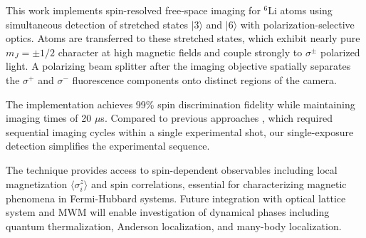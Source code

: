 This work implements spin-resolved free-space imaging for $^6$Li atoms using simultaneous detection of stretched states $|3\rangle$ and $|6\rangle$ with polarization-selective optics. Atoms are transferred to these stretched states, which exhibit nearly pure $m_J = \pm 1/2$ character at high magnetic fields and couple strongly to $\sigma^{\pm}$ polarized light. A polarizing beam splitter after the imaging objective spatially separates the $\sigma^+$ and $\sigma^-$ fluorescence components onto distinct regions of the camera.

The implementation achieves 99\% spin discrimination fidelity while maintaining imaging times of 20 $\mu$s. Compared to previous approaches \cite{bergschneider_spin-resolved_2018}, which required sequential imaging cycles within a single experimental shot, our single-exposure detection simplifies the experimental sequence.

The technique provides access to spin-dependent observables including local magnetization $\langle \sigma^z_i \rangle$ and spin correlations, essential for characterizing magnetic phenomena in Fermi-Hubbard systems. 
Future integration with optical lattice system and MWM will enable
investigation of dynamical phases including quantum thermalization, Anderson localization, and many-body localization. 
